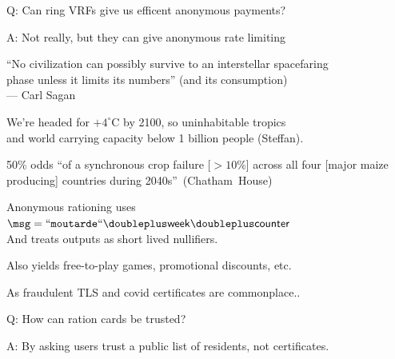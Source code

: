 \documentclass{beamer}
\begin{document}
\begin{frame}

Q: Can ring VRFs give us efficent anonymous payments?

\bigskip

A: Not really, but they can give anonymous rate limiting

\end{frame}



\begin{frame}

``No civilization can possibly survive to an interstellar spacefaring \\ \smallskip
\hspace{1pt} phase unless it limits its numbers'' (and its consumption) \\ \medskip
\hspace{1pt} --- Carl Sagan

\bigskip\bigskip 

We're headed for $+4^{\circ}$C by 2100, so uninhabitable tropics \\
\hspace{10pt} and world carrying capacity below 1 billion people (Steffan). \\ \bigskip

50\% odds ``of a synchronous crop failure [$>10$\%] across all four [major maize producing] countries during 2040s''~(Chatham~House) \\

\end{frame}



\begin{frame}

Anonymous rationing uses $\msg = \mathtt{``moutarde``} \doubleplus \mathsf{week} \doubleplus \mathsf{counter}$ \\
\hspace{1pt} And treats outputs as short lived nullifiers.

\bigskip\bigskip 

Also yields free-to-play games, promotional discounts, etc.

\end{frame}



\begin{frame}

As fraudulent TLS and covid certificates are commonplace..

\bigskip

Q: How can ration cards be trusted?

\bigskip 

A: By asking users trust a public list of residents, not certificates.


\end{frame}
\end{document}
